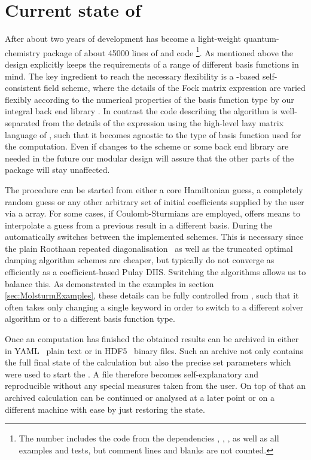\section{Current state of \molsturm}
\label{sec:MolsturmState}

After about two years of development
\molsturm has become a light-weight quantum-chemistry package of about 45000
lines of \cpp and \python code%
\footnote{The number includes the code from the dependencies \gint, \gscf, \lazyten, \krims as well as all examples and tests, but comment lines and blanks are not counted.}.
As mentioned above the design explicitly keeps the requirements of a range of
different basis functions in mind.
The key ingredient to reach the necessary flexibility
is a \contraction-based self-consistent field scheme,
where the details of the Fock matrix \contraction expression
are varied flexibly according to the numerical properties of the basis function type
by our integral back end library \gint.
In contrast
the code describing the \SCF algorithm
is well-separated from the details of the \contraction expression
using the high-level lazy matrix language of \lazyten,
such that it becomes agnostic to the type of basis function used for the computation.
Even if changes to the \SCF scheme or some back end
library are needed in the future our modular design
will assure that the other parts of the \molsturm package will stay unaffected.

The \SCF procedure can be started from either a core Hamiltonian guess,
a completely random guess or any other arbitrary set of initial
coefficients supplied by the user via a \numpy array.
For some cases, \eg if Coulomb-Sturmians are employed,
\molsturm offers means to interpolate a guess from a previous result
in a different basis.
During the \SCF \molsturm automatically switches between
the implemented \SCF schemes.
This is necessary since the plain Roothaan
repeated diagonalisation~\cite{Roothaan1951}
as well as the truncated optimal damping algorithm schemes
are cheaper, but typically do not converge as efficiently
as a coefficient-based Pulay DIIS.
Switching the algorithms allows us to balance this.
As demonstrated in the examples in section \ref{sec:MolsturmExamples},
these details can be fully controlled from \python,
such that it often takes only changing a single keyword
in order to switch to a different solver algorithm or to a different
basis function type.

Once an \SCF computation has finished the obtained results can be archived
in either in YAML~\cite{Ben-Kiki2009} plain text or in HDF5~\cite{HDF5Manual}
binary files.
Such an archive not only contains the full final state of the calculation
but also the precise set parameters which were used to start the \SCF.
A file therefore becomes self-explanatory and reproducible
without any special measures taken from the user.
On top of that an archived calculation can be continued
or analysed at a later point or on a different machine with ease
by just restoring the state.

